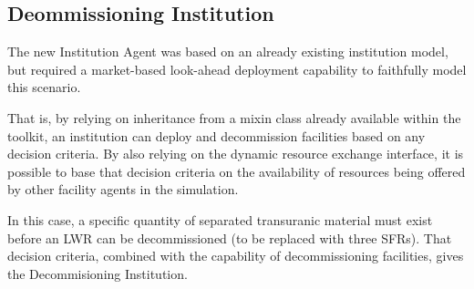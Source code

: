 
\label{sec:decomminst}
\subsection{Deommissioning Institution}
The new Institution Agent was based on an already existing institution
model, but required a market-based look-ahead deployment capability to
faithfully model this scenario. 

That is, by relying on inheritance from a mixin class already available within 
the \Cyclus toolkit, an institution can deploy and decommission facilities 
based on any decision criteria. By also relying on the dynamic resource 
exchange interface, it is possible to base that decision criteria on the 
availability of resources being offered by other facility agents in the 
simulation. 

In this case, a specific quantity of separated transuranic material must exist 
before an LWR can be decommissioned (to be replaced with three SFRs). That 
decision criteria, combined with the capability of decommissioning facilities, 
gives the Decommisioning Institution. 


